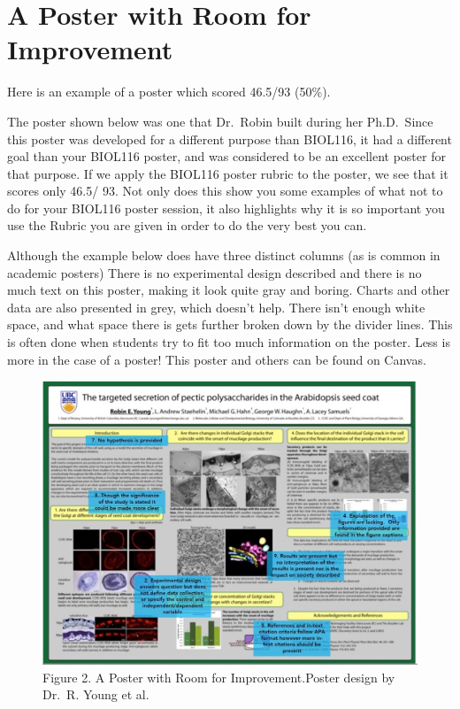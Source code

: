 \documentclass[
]{book}
\begin{document}
\hypertarget{a-poster-with-room-for-improvement}{%
\section*{A Poster with Room for Improvement}\label{a-poster-with-room-for-improvement}}

Here is an example of a poster which scored 46.5/93 (50\%).

The poster shown below was one that Dr.~Robin built during her Ph.D.~Since this poster was developed for a different purpose than BIOL116, it had a different goal than your BIOL116 poster, and was considered to be an excellent poster for that purpose. If we apply the BIOL116 poster rubric to the poster, we see that it scores only 46.5/ 93. Not only does this show you some examples of what not to do for your BIOL116 poster session, it also highlights why it is so important you use the Rubric you are given in order to do the very best you can.

Although the example below does have three distinct columns (as is common in academic posters) There is no experimental design described and there is no much text on this poster, making it look quite gray and boring. Charts and other data are also presented in grey, which doesn't help. There isn't enough white space, and what space there is gets further broken down by the divider lines. This is often done when students try to fit too much information on the poster. Less is more in the case of a poster! This poster and others can be found on Canvas.

\begin{figure}
\centering
\includegraphics{figures_images/Lab10-Fig2.png}
\caption{Figure 2. A Poster with Room for Improvement.Poster design by Dr.~R. Young et al.}
\end{figure}
\end{document}
